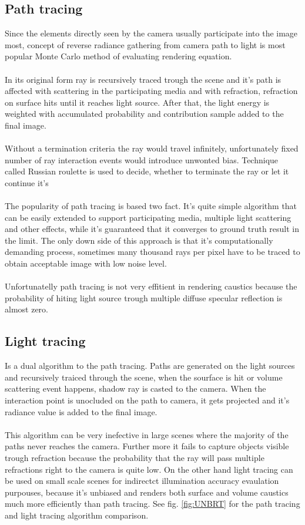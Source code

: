 \subsection{Path tracing}
Since the elements directly seen by the camera usually participate into the image most, concept of reverse radiance gathering from camera path to light is most popular Monte Carlo method of evaluating rendering equation. 
\\
\\
In its original form ray is recursively traced trough the scene and it's path is affected with scattering in the participating media and with refraction, refraction on surface hits until it reaches light source. After that, the light energy is weighted with accumulated probability and contribution sample added to the final image. 
\\
\\
Without a termination criteria the ray would travel infinitely, unfortunately fixed number of ray interaction events would introduce unwonted bias. Technique called Russian roulette is used to decide, whether to terminate the ray or let it continue it's
\\
\\
The popularity of path tracing is based two fact. It's quite simple algorithm that can be easily extended to support participating media, multiple light scattering and other effects, while it's guaranteed that it converges to ground truth result in the limit. The only down side of this approach is that it's computationally demanding process, sometimes many thousand rays per pixel have to be traced to obtain acceptable image with low noise level.
\\
\\
Unfortunatelly path tracing is not very effitient in rendering caustics because the probability of hiting light source trough multiple diffuse specular reflection is almost zero.




\subsection{Light tracing}
Is a dual algorithm to the path tracing. Paths are generated on the light sources and recursively traiced through the scene, when the sourface is hit or volume scattering event happens, shadow ray is casted to the camera. When the interaction point is unocluded on the path to camera, it gets projected and it's radiance value is added to the final image. 
\\
\\
This algorithm can be very inefective in large scenes where the majority of the paths never reaches the camera. Further more it fails to capture objects visible trough refraction because the probability that the ray will pass multiple refractions right to the camera is quite low. On the other hand light tracing can be used on small scale scenes for indirectct illumination accuracy evaulation purpouses, because it's unbiased and renders both surface and volume caustics much more efficiently than path tracing. See fig. \ref{fig:UNBRT} for the path tracing and light tracing algorithm comparison.


